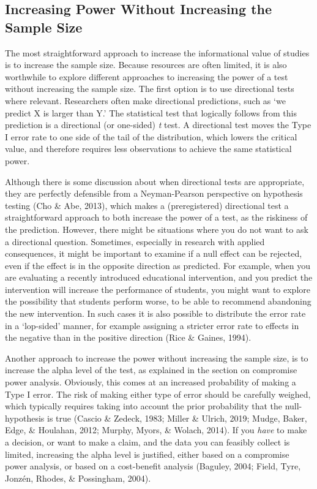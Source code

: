 \documentclass[
  english,
  ,jou, a4paper,floatsintext]{apa6}
\begin{document}
\hypertarget{increasing-power-without-increasing-the-sample-size}{%
\subsection{Increasing Power Without Increasing the Sample Size}\label{increasing-power-without-increasing-the-sample-size}}

The most straightforward approach to increase the informational value of studies is to increase the sample size. Because resources are often limited, it is also worthwhile to explore different approaches to increasing the power of a test without increasing the sample size. The first option is to use directional tests where relevant. Researchers often make directional predictions, such as `we predict X is larger than Y.' The statistical test that logically follows from this prediction is a directional (or one-sided) \emph{t} test. A directional test moves the Type I error rate to one side of the tail of the distribution, which lowers the critical value, and therefore requires less observations to achieve the same statistical power.

Although there is some discussion about when directional tests are appropriate, they are perfectly defensible from a Neyman-Pearson perspective on hypothesis testing (Cho \& Abe, 2013), which makes a (preregistered) directional test a straightforward approach to both increase the power of a test, as the riskiness of the prediction. However, there might be situations where you do not want to ask a directional question. Sometimes, especially in research with applied consequences, it might be important to examine if a null effect can be rejected, even if the effect is in the opposite direction as predicted. For example, when you are evaluating a recently introduced educational intervention, and you predict the intervention will increase the performance of students, you might want to explore the possibility that students perform worse, to be able to recommend abandoning the new intervention. In such cases it is also possible to distribute the error rate in a `lop-sided' manner, for example assigning a stricter error rate to effects in the negative than in the positive direction (Rice \& Gaines, 1994).

Another approach to increase the power without increasing the sample size, is to increase the alpha level of the test, as explained in the section on compromise power analysis. Obviously, this comes at an increased probability of making a Type I error. The risk of making either type of error should be carefully weighed, which typically requires taking into account the prior probability that the null-hypothesis is true (Cascio \& Zedeck, 1983; Miller \& Ulrich, 2019; Mudge, Baker, Edge, \& Houlahan, 2012; Murphy, Myors, \& Wolach, 2014). If you \emph{have} to make a decision, or want to make a claim, and the data you can feasibly collect is limited, increasing the alpha level is justified, either based on a compromise power analysis, or based on a cost-benefit analysis (Baguley, 2004; Field, Tyre, Jonzén, Rhodes, \& Possingham, 2004).
\end{document}
